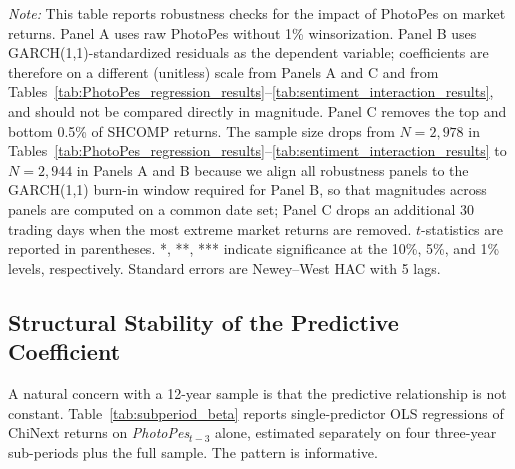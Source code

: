 \documentclass[AER]{AEA}
\begin{document}
\begin{table}[h!]
\vspace{0.2cm}
\footnotesize
\textit{Note:} This table reports robustness checks for the impact of PhotoPes on market returns. Panel A uses raw PhotoPes without 1\% winsorization. Panel B uses GARCH(1,1)-standardized residuals as the dependent variable; coefficients are therefore on a different (unitless) scale from Panels A and C and from Tables~\ref{tab:PhotoPes_regression_results}--\ref{tab:sentiment_interaction_results}, and should not be compared directly in magnitude. Panel C removes the top and bottom 0.5\% of SHCOMP returns. The sample size drops from $N=2{,}978$ in Tables~\ref{tab:PhotoPes_regression_results}--\ref{tab:sentiment_interaction_results} to $N=2{,}944$ in Panels A and B because we align all robustness panels to the GARCH(1,1) burn-in window required for Panel B, so that magnitudes across panels are computed on a common date set; Panel C drops an additional 30 trading days when the most extreme market returns are removed. $t$-statistics are reported in parentheses. *, **, *** indicate significance at the 10\%, 5\%, and 1\% levels, respectively. Standard errors are Newey--West HAC with 5 lags.
\end{table}

\subsection{Structural Stability of the Predictive Coefficient}
\label{sec:break_test}

A natural concern with a 12-year sample is that the predictive relationship is not constant. Table~\ref{tab:subperiod_beta} reports single-predictor OLS regressions of ChiNext returns on \textit{PhotoPes}$_{t-3}$ alone, estimated separately on four three-year sub-periods plus the full sample. The pattern is informative.
\end{document}
